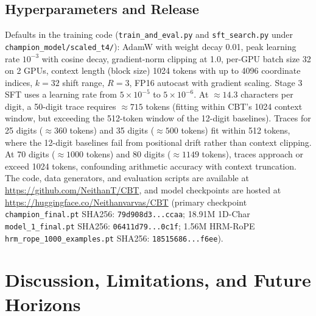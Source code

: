 \documentclass[10pt,twocolumn]{article}
\begin{document}
\subsection{Hyperparameters and Release}
\noindent Defaults in the training code (\texttt{train\_and\_eval.py} and \texttt{sft\_search.py} under \texttt{champion\_model/scaled\_t4/}): AdamW with weight decay 0.01, peak learning rate $10^{-3}$ with cosine decay, gradient-norm clipping at 1.0, per-GPU batch size 32 on 2 GPUs, context length (block size) 1024 tokens with up to 4096 coordinate indices, $k=32$ shift range, $R=3$, FP16 autocast with gradient scaling. Stage 3 SFT uses a learning rate from $5\times10^{-5}$ to $5\times10^{-6}$. At $\approx 14.3$ characters per digit, a 50-digit trace requires $\approx 715$ tokens (fitting within CBT's 1024 context window, but exceeding the 512-token window of the 12-digit baselines). Traces for 25 digits ($\approx 360$ tokens) and 35 digits ($\approx 500$ tokens) fit within 512 tokens, where the 12-digit baselines fail from positional drift rather than context clipping. At 70 digits ($\approx 1000$ tokens) and 80 digits ($\approx 1149$ tokens), traces approach or exceed 1024 tokens, confounding arithmetic accuracy with context truncation. The code, data generators, and evaluation scripts are available at \url{https://github.com/NeithanT/CBT}, and model checkpoints are hosted at \url{https://huggingface.co/Neithanvarvas/CBT} (primary checkpoint \texttt{champion\_final.pt} SHA256: \texttt{79d908d3...ccaa}; 18.91M 1D-Char \texttt{model\_1\_final.pt} SHA256: \texttt{06411d79...0c1f}; 1.56M HRM-RoPE \texttt{hrm\_rope\_1000\_examples.pt} SHA256: \texttt{18515686...f6ee}).

\section{Discussion, Limitations, and Future Horizons}
\end{document}
